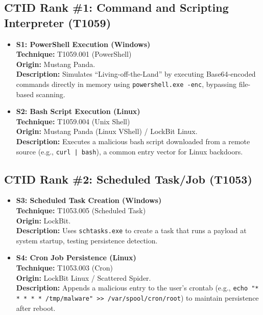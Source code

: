 \subsection{CTID Rank \#1: Command and Scripting Interpreter (T1059)}
\begin{itemize}
    \item \textbf{S1: PowerShell Execution (Windows)} \\
    \textbf{Technique:} T1059.001 (PowerShell) \\
    \textbf{Origin:} Mustang Panda. \\
    \textbf{Description:} Simulates ``Living-off-the-Land'' by executing Base64-encoded commands directly in memory using \texttt{powershell.exe -enc}, bypassing file-based scanning.

    \item \textbf{S2: Bash Script Execution (Linux)} \\
    \textbf{Technique:} T1059.004 (Unix Shell) \\
    \textbf{Origin:} Mustang Panda (Linux VShell) / LockBit Linux. \\
    \textbf{Description:} Executes a malicious bash script downloaded from a remote source (e.g., \texttt{curl | bash}), a common entry vector for Linux backdoors.
\end{itemize}

\subsection{CTID Rank \#2: Scheduled Task/Job (T1053)}
\begin{itemize}
    \item \textbf{S3: Scheduled Task Creation (Windows)} \\
    \textbf{Technique:} T1053.005 (Scheduled Task) \\
    \textbf{Origin:} LockBit. \\
    \textbf{Description:} Uses \texttt{schtasks.exe} to create a task that runs a payload at system startup, testing persistence detection.

    \item \textbf{S4: Cron Job Persistence (Linux)} \\
    \textbf{Technique:} T1053.003 (Cron) \\
    \textbf{Origin:} LockBit Linux / Scattered Spider. \\
    \textbf{Description:} Appends a malicious entry to the user's crontab (e.g., \texttt{echo "* * * * * /tmp/malware" >> /var/spool/cron/root}) to maintain persistence after reboot.
\end{itemize}

